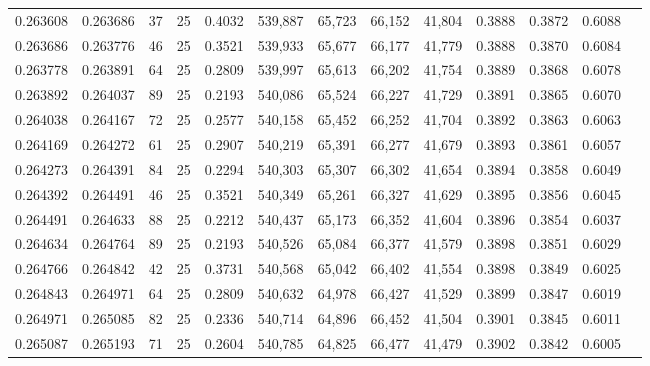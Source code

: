 \begin{tabular}{rrrrrrrrrrrrr}
0.263608 & 0.263686 &    37 &  25 &                                     0.4032 & 539,887 &  65,723 &  66,152 &  41,804 & 0.3888 & 0.3872 & 0.6088 \\
0.263686 & 0.263776 &    46 &  25 &                                     0.3521 & 539,933 &  65,677 &  66,177 &  41,779 & 0.3888 & 0.3870 & 0.6084 \\
0.263778 & 0.263891 &    64 &  25 &                                     0.2809 & 539,997 &  65,613 &  66,202 &  41,754 & 0.3889 & 0.3868 & 0.6078 \\
0.263892 & 0.264037 &    89 &  25 &                                     0.2193 & 540,086 &  65,524 &  66,227 &  41,729 & 0.3891 & 0.3865 & 0.6070 \\
0.264038 & 0.264167 &    72 &  25 &                                     0.2577 & 540,158 &  65,452 &  66,252 &  41,704 & 0.3892 & 0.3863 & 0.6063 \\
0.264169 & 0.264272 &    61 &  25 &                                     0.2907 & 540,219 &  65,391 &  66,277 &  41,679 & 0.3893 & 0.3861 & 0.6057 \\
0.264273 & 0.264391 &    84 &  25 &                                     0.2294 & 540,303 &  65,307 &  66,302 &  41,654 & 0.3894 & 0.3858 & 0.6049 \\
0.264392 & 0.264491 &    46 &  25 &                                     0.3521 & 540,349 &  65,261 &  66,327 &  41,629 & 0.3895 & 0.3856 & 0.6045 \\
0.264491 & 0.264633 &    88 &  25 &                                     0.2212 & 540,437 &  65,173 &  66,352 &  41,604 & 0.3896 & 0.3854 & 0.6037 \\
0.264634 & 0.264764 &    89 &  25 &                                     0.2193 & 540,526 &  65,084 &  66,377 &  41,579 & 0.3898 & 0.3851 & 0.6029 \\
0.264766 & 0.264842 &    42 &  25 &                                     0.3731 & 540,568 &  65,042 &  66,402 &  41,554 & 0.3898 & 0.3849 & 0.6025 \\
0.264843 & 0.264971 &    64 &  25 &                                     0.2809 & 540,632 &  64,978 &  66,427 &  41,529 & 0.3899 & 0.3847 & 0.6019 \\
0.264971 & 0.265085 &    82 &  25 &                                     0.2336 & 540,714 &  64,896 &  66,452 &  41,504 & 0.3901 & 0.3845 & 0.6011 \\
0.265087 & 0.265193 &    71 &  25 &                                     0.2604 & 540,785 &  64,825 &  66,477 &  41,479 & 0.3902 & 0.3842 & 0.6005 \\

\end{tabular}
